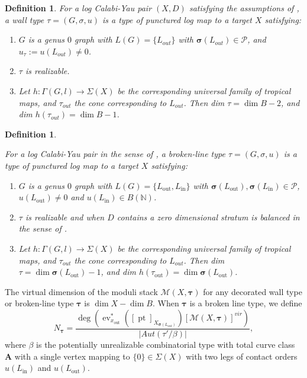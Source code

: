 \documentclass[12pt, oneside]{amsart}   	%
\newcounter{thm}
\newtheorem{definition}[thm]{Definition}
\newcommand{\NN}{\mathbb{N}}
\newcommand{\pt}{\operatorname{pt}}
\newcommand{\ev}{\operatorname{ev}}
\newcommand{\out}{\operatorname{out}}
\numberwithin{equation}{section}
\numberwithin{thm}{section}
\numberwithin{figure}{section}
\begin{document}
\begin{definition}
For a log Calabi-Yau pair $(X,D)$ satisfying the assumptions of \cite{scatt}, a wall type $\tau = (G,\sigma,u)$ is a type of punctured log map to a target $X$ satisfying:
\begin{enumerate}
\item $G$ is a genus $0$ graph with $L(G) = \{L_{out}\}$ with $\pmb\sigma(L_{out}) \in \mathscr{P}$, and $u_\tau := u(L_{out}) \not= 0$. 
\item $\tau$ is realizable.
\item Let $h: \Gamma(G,l) \rightarrow \Sigma(X)$ be the corresponding universal family of tropical maps, and $\tau_{out}$ the cone corresponding to $L_{out}$. Then dim $\tau = \dim B-2$, and dim $h(\tau_{out}) = \dim B-1$. 
\end{enumerate}
\end{definition}

\begin{definition}\label{bltype}

For a log Calabi-Yau pair in the sense of \cite{int_mirror}, a broken-line type $\tau = (G,\sigma,u)$ is a type of punctured log map to a target $X$ satisfying:
\begin{enumerate}
\item $G$ is a genus $0$ graph with $L(G) = \{L_{\out},L_{\text{in}}\}$ with $\pmb\sigma(L_{\out}),\pmb\sigma(L_{\text{in}}) \in \mathscr{P}$, $u(L_{\out}) \not= 0$ and $u(L_{\text{in}}) \in B(\NN)$. 
\item $\tau$ is realizable and when $D$ contains a zero dimensional stratum is balanced in the sense of \cite{scatt}.
\item Let $h: \Gamma(G,l) \rightarrow \Sigma(X)$ be the corresponding universal family of tropical maps, and $\tau_{out}$ the cone corresponding to $L_{out}$. Then dim $\tau = \dim \pmb\sigma(L_{\out})-1$, and dim $h(\tau_{\out}) = \dim \pmb\sigma(L_{\out})$. 
\end{enumerate}
\end{definition}


The virtual dimension of the moduli stack $\mathscr{M}(X,\pmb\tau)$ for any decorated wall type or broken-line type $\pmb\tau$ is $\dim X - \dim B$. When $\pmb\tau$ is a broken line type, we define
 $$N_{\pmb\tau} = \frac{\deg(\ev_{x_{\out}}^*([\pt]_{X_{\pmb\sigma(L_{\out})}})[\mathscr{M}(X,\pmb\tau)]^{vir})}{|Aut(\tau'/\beta)|},$$
where $\beta$ is the potentially unrealizable combinatorial type with total curve class $\textbf{A}$ with a single vertex mapping to $\{0\} \in \Sigma(X)$ with two legs of contact orders $u(L_{\operatorname{in}})$ and $u(L_{\out})$.
\end{document}
